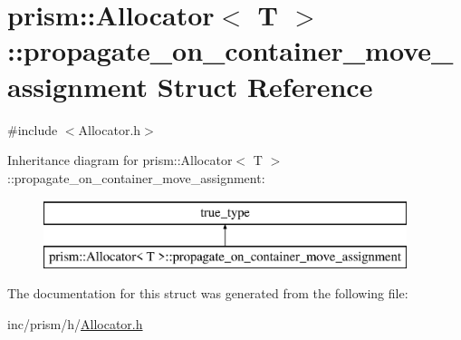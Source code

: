 \hypertarget{structprism_1_1_allocator_1_1propagate__on__container__move__assignment}{}\section{prism\+:\+:Allocator$<$ T $>$\+:\+:propagate\+\_\+on\+\_\+container\+\_\+move\+\_\+assignment Struct Reference}
\label{structprism_1_1_allocator_1_1propagate__on__container__move__assignment}


{\ttfamily \#include $<$Allocator.\+h$>$}

Inheritance diagram for prism\+:\+:Allocator$<$ T $>$\+:\+:propagate\+\_\+on\+\_\+container\+\_\+move\+\_\+assignment\+:\begin{figure}[H]
\begin{center}
\leavevmode
\includegraphics[height=2.000000cm]{structprism_1_1_allocator_1_1propagate__on__container__move__assignment}
\end{center}
\end{figure}


The documentation for this struct was generated from the following file\+:\begin{DoxyCompactItemize}
\item 
inc/prism/h/\hyperlink{_allocator_8h}{Allocator.\+h}\end{DoxyCompactItemize}
